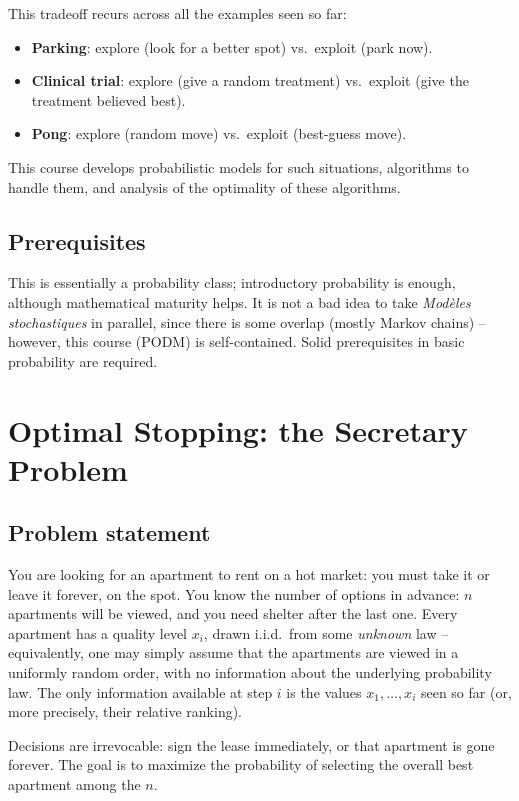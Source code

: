 This tradeoff recurs across all the examples seen so far:
\begin{itemize}
    \item \textbf{Parking}: explore (look for a better spot) vs.\ exploit (park now).
    \item \textbf{Clinical trial}: explore (give a random treatment) vs.\ exploit (give the treatment believed best).
    \item \textbf{Pong}: explore (random move) vs.\ exploit (best-guess move).
\end{itemize}

This course develops probabilistic models for such situations, algorithms to handle them, and analysis of the optimality of these algorithms.

\subsection{Prerequisites}

This is essentially a probability class; introductory probability is enough, although mathematical maturity helps. It is not a bad idea to take \emph{Modèles stochastiques} in parallel, since there is some overlap (mostly Markov chains) -- however, this course (PODM) is self-contained. Solid prerequisites in basic probability are required.

\section{Optimal Stopping: the Secretary Problem}

\subsection{Problem statement}

\begin{definition}
You are looking for an apartment to rent on a hot market: you must take it or leave it forever, on the spot. You know the number of options in advance: $n$ apartments will be viewed, and you need shelter after the last one. Every apartment has a quality level $x_i$, drawn i.i.d.\ from some \emph{unknown} law -- equivalently, one may simply assume that the apartments are viewed in a uniformly random order, with no information about the underlying probability law. The only information available at step $i$ is the values $x_1, \dots, x_i$ seen so far (or, more precisely, their relative ranking).

Decisions are irrevocable: sign the lease immediately, or that apartment is gone forever. The goal is to maximize the probability of selecting the overall best apartment among the $n$.
\end{definition}

